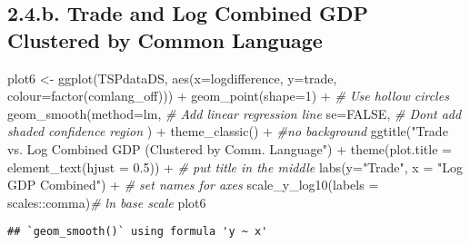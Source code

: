 \documentclass[
]{article}
\newenvironment{Shaded}{\begin{snugshade}}{\end{snugshade}}
\newcommand{\AttributeTok}[1]{\textcolor[rgb]{0.77,0.63,0.00}{#1}}
\newcommand{\CommentTok}[1]{\textcolor[rgb]{0.56,0.35,0.01}{\textit{#1}}}
\newcommand{\ConstantTok}[1]{\textcolor[rgb]{0.00,0.00,0.00}{#1}}
\newcommand{\DecValTok}[1]{\textcolor[rgb]{0.00,0.00,0.81}{#1}}
\newcommand{\FloatTok}[1]{\textcolor[rgb]{0.00,0.00,0.81}{#1}}
\newcommand{\FunctionTok}[1]{\textcolor[rgb]{0.00,0.00,0.00}{#1}}
\newcommand{\NormalTok}[1]{#1}
\newcommand{\OtherTok}[1]{\textcolor[rgb]{0.56,0.35,0.01}{#1}}
\newcommand{\SpecialCharTok}[1]{\textcolor[rgb]{0.00,0.00,0.00}{#1}}
\newcommand{\StringTok}[1]{\textcolor[rgb]{0.31,0.60,0.02}{#1}}
\begin{document}
\hypertarget{b.-trade-and-log-combined-gdp-clustered-by-common-language}{%
\subsection{2.4.b. Trade and Log Combined GDP Clustered by Common
Language}\label{b.-trade-and-log-combined-gdp-clustered-by-common-language}}

\begin{Shaded}
\begin{Highlighting}[]
\NormalTok{plot6 }\OtherTok{\textless{}{-}} \FunctionTok{ggplot}\NormalTok{(TSPdataDS, }\FunctionTok{aes}\NormalTok{(}\AttributeTok{x=}\NormalTok{logdifference,}
                         \AttributeTok{y=}\NormalTok{trade, }\AttributeTok{colour=}\FunctionTok{factor}\NormalTok{(comlang\_off))) }\SpecialCharTok{+}
                        \FunctionTok{geom\_point}\NormalTok{(}\AttributeTok{shape=}\DecValTok{1}\NormalTok{) }\SpecialCharTok{+} \CommentTok{\# Use hollow circles}
                        \FunctionTok{geom\_smooth}\NormalTok{(}\AttributeTok{method=}\NormalTok{lm, }\CommentTok{\# Add linear regression line}
                                \AttributeTok{se=}\ConstantTok{FALSE}\NormalTok{,   }\CommentTok{\# Don\textquotesingle{}t add shaded confidence region}
\NormalTok{                                ) }\SpecialCharTok{+} 
                        \FunctionTok{theme\_classic}\NormalTok{() }\SpecialCharTok{+} \CommentTok{\#no background}
                        \FunctionTok{ggtitle}\NormalTok{(}\StringTok{"Trade vs. Log Combined GDP (Clustered by Comm. Language"}\NormalTok{) }\SpecialCharTok{+}
                        \FunctionTok{theme}\NormalTok{(}\AttributeTok{plot.title =} \FunctionTok{element\_text}\NormalTok{(}\AttributeTok{hjust =} \FloatTok{0.5}\NormalTok{)) }\SpecialCharTok{+} \CommentTok{\# put title in the middle}
                        \FunctionTok{labs}\NormalTok{(}\AttributeTok{y=}\StringTok{"Trade"}\NormalTok{, }\AttributeTok{x =} \StringTok{"Log GDP Combined"}\NormalTok{) }\SpecialCharTok{+} \CommentTok{\# set names for axes}
                        \FunctionTok{scale\_y\_log10}\NormalTok{(}\AttributeTok{labels =}\NormalTok{ scales}\SpecialCharTok{::}\NormalTok{comma)}\CommentTok{\# ln base scale}
\NormalTok{plot6}
\end{Highlighting}
\end{Shaded}

\begin{verbatim}
## `geom_smooth()` using formula 'y ~ x'
\end{verbatim}
\end{document}
